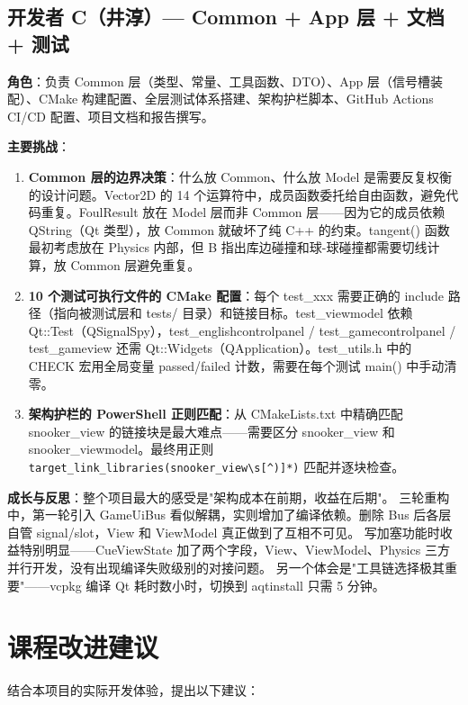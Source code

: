 \documentclass[11pt]{ctexart}
\begin{document}
\subsection{开发者 C（井淳）— Common + App 层 + 文档 + 测试}

\textbf{角色}：负责 Common 层（类型、常量、工具函数、DTO）、App 层（信号槽装配）、CMake 构建配置、全层测试体系搭建、架构护栏脚本、GitHub Actions CI/CD 配置、项目文档和报告撰写。

\textbf{主要挑战}：
\begin{enumerate}[leftmargin=*]
\item \textbf{Common 层的边界决策}：什么放 Common、什么放 Model 是需要反复权衡的设计问题。Vector2D 的 14 个运算符中，成员函数委托给自由函数，避免代码重复。FoulResult 放在 Model 层而非 Common 层——因为它的成员依赖 QString（Qt 类型），放 Common 就破坏了纯 C++ 的约束。tangent() 函数最初考虑放在 Physics 内部，但 B 指出库边碰撞和球-球碰撞都需要切线计算，放 Common 层避免重复。
\item \textbf{10 个测试可执行文件的 CMake 配置}：每个 test\_xxx 需要正确的 include 路径（指向被测试层和 tests/ 目录）和链接目标。test\_viewmodel 依赖 Qt::Test（QSignalSpy），test\_englishcontrolpanel / test\_gamecontrolpanel / test\_gameview 还需 Qt::Widgets（QApplication）。test\_utils.h 中的 CHECK 宏用全局变量 passed/failed 计数，需要在每个测试 main() 中手动清零。
\item \textbf{架构护栏的 PowerShell 正则匹配}：从 CMakeLists.txt 中精确匹配 snooker\_view 的链接块是最大难点——需要区分 snooker\_view 和 snooker\_viewmodel。最终用正则 \verb|target_link_libraries(snooker_view\s[^)]*)| 匹配并逐块检查。
\end{enumerate}

\textbf{成长与反思}：整个项目最大的感受是"架构成本在前期，收益在后期"。
三轮重构中，第一轮引入 GameUiBus 看似解耦，实则增加了编译依赖。删除 Bus 后各层自管 signal/slot，View 和 ViewModel 真正做到了互相不可见。
写加塞功能时收益特别明显——CueViewState 加了两个字段，View、ViewModel、Physics 三方并行开发，没有出现编译失败级别的对接问题。
另一个体会是"工具链选择极其重要"——vcpkg 编译 Qt 耗时数小时，切换到 aqtinstall 只需 5 分钟。

\section{课程改进建议}

结合本项目的实际开发体验，提出以下建议：
\end{document}
